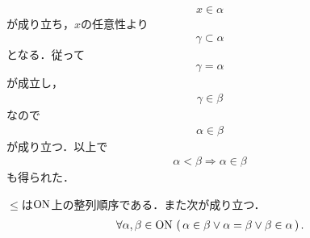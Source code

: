 \begin{prf}
\begin{align}
			x \in \alpha
		\end{align}
		が成り立ち，$x$の任意性より
		\begin{align}
			\gamma \subset \alpha
		\end{align}
		となる．従って
		\begin{align}
			\gamma = \alpha
		\end{align}
		が成立し，
		\begin{align}
			\gamma \in \beta
		\end{align}
		なので
		\begin{align}
			\alpha \in \beta
		\end{align}
		が成り立つ．以上で
		\begin{align}
			\alpha < \beta \Longrightarrow \alpha \in \beta
		\end{align}
		も得られた．
		\QED
	\end{prf}
	
	\begin{screen}
		\begin{thm}[$\ON$の整列性]\label{thm:On_is_wellordered}
			$\leq$は$\ON$上の整列順序である．また次が成り立つ．
			\begin{align}
				\forall \alpha,\beta \in \mathrm{ON}\,
				\left(\, \alpha \in \beta \vee \alpha = \beta \vee \beta \in \alpha\, \right).
			\end{align}
		\end{thm}
	\end{screen}
	
